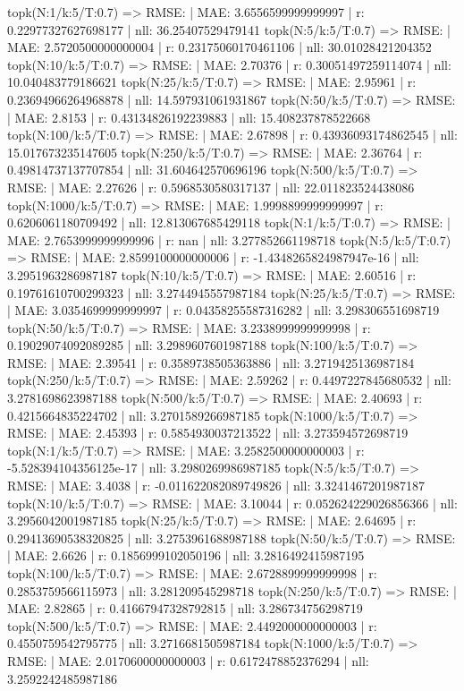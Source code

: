 topk(N:1/k:5/T:0.7) => RMSE: | MAE: 3.6556599999999997 | r: 0.22977327627698177 | nll: 36.25407529479141
topk(N:5/k:5/T:0.7) => RMSE: | MAE: 2.5720500000000004 | r: 0.23175060170461106 | nll: 30.01028421204352
topk(N:10/k:5/T:0.7) => RMSE: | MAE: 2.70376 | r: 0.30051497259114074 | nll: 10.040483779186621
topk(N:25/k:5/T:0.7) => RMSE: | MAE: 2.95961 | r: 0.23694966264968878 | nll: 14.597931061931867
topk(N:50/k:5/T:0.7) => RMSE: | MAE: 2.8153 | r: 0.43134826192239883 | nll: 15.408237878522668
topk(N:100/k:5/T:0.7) => RMSE: | MAE: 2.67898 | r: 0.43936093174862545 | nll: 15.017673235147605
topk(N:250/k:5/T:0.7) => RMSE: | MAE: 2.36764 | r: 0.49814737137707854 | nll: 31.604642570696196
topk(N:500/k:5/T:0.7) => RMSE: | MAE: 2.27626 | r: 0.5968530580317137 | nll: 22.011823524438086
topk(N:1000/k:5/T:0.7) => RMSE: | MAE: 1.9998899999999997 | r: 0.6206061180709492 | nll: 12.813067685429118
topk(N:1/k:5/T:0.7) => RMSE: | MAE: 2.7653999999999996 | r: nan | nll: 3.277852661198718
topk(N:5/k:5/T:0.7) => RMSE: | MAE: 2.8599100000000006 | r: -1.4348265824987947e-16 | nll: 3.2951963286987187
topk(N:10/k:5/T:0.7) => RMSE: | MAE: 2.60516 | r: 0.19761610700299323 | nll: 3.2744945557987184
topk(N:25/k:5/T:0.7) => RMSE: | MAE: 3.0354699999999997 | r: 0.04358255587316282 | nll: 3.298306551698719
topk(N:50/k:5/T:0.7) => RMSE: | MAE: 3.2338999999999998 | r: 0.19029074092089285 | nll: 3.2989607601987188
topk(N:100/k:5/T:0.7) => RMSE: | MAE: 2.39541 | r: 0.3589738505363886 | nll: 3.2719425136987184
topk(N:250/k:5/T:0.7) => RMSE: | MAE: 2.59262 | r: 0.4497227845680532 | nll: 3.2781698623987188
topk(N:500/k:5/T:0.7) => RMSE: | MAE: 2.40693 | r: 0.4215664835224702 | nll: 3.2701589266987185
topk(N:1000/k:5/T:0.7) => RMSE: | MAE: 2.45393 | r: 0.5854930037213522 | nll: 3.273594572698719
topk(N:1/k:5/T:0.7) => RMSE: | MAE: 3.2582500000000003 | r: -5.528394104356125e-17 | nll: 3.2980269986987185
topk(N:5/k:5/T:0.7) => RMSE: | MAE: 3.4038 | r: -0.011622082089749826 | nll: 3.3241467201987187
topk(N:10/k:5/T:0.7) => RMSE: | MAE: 3.10044 | r: 0.052624229026856366 | nll: 3.2956042001987185
topk(N:25/k:5/T:0.7) => RMSE: | MAE: 2.64695 | r: 0.29413690538320825 | nll: 3.2753961688987188
topk(N:50/k:5/T:0.7) => RMSE: | MAE: 2.6626 | r: 0.1856999102050196 | nll: 3.2816492415987195
topk(N:100/k:5/T:0.7) => RMSE: | MAE: 2.6728899999999998 | r: 0.2853759566115973 | nll: 3.281209545298718
topk(N:250/k:5/T:0.7) => RMSE: | MAE: 2.82865 | r: 0.41667947328792815 | nll: 3.286734756298719
topk(N:500/k:5/T:0.7) => RMSE: | MAE: 2.4492000000000003 | r: 0.4550759542795775 | nll: 3.2716681505987184
topk(N:1000/k:5/T:0.7) => RMSE: | MAE: 2.0170600000000003 | r: 0.6172478852376294 | nll: 3.2592242485987186
